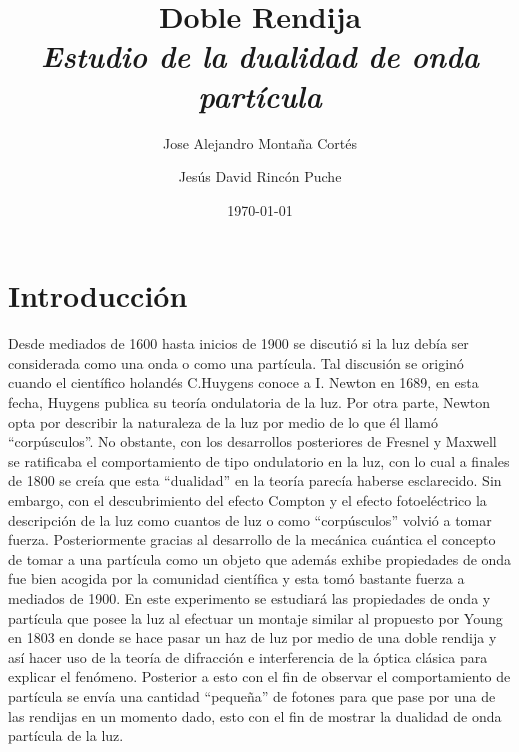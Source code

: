 \documentclass[%
 reprint,
 amsmath,amssymb,
 aps,
]{revtex4-1}
\newcommand{\subtitle}[1]{%
\posttitle{%
    \par\end{center}
\begin{center}\large#1\end{center}
\vskip0.5em}%
}
\begin{document}

\title{Doble Rendija\\ \textit{Estudio de la dualidad de onda partícula} }%


\author{Jose Alejandro Montaña Cortés}
\author{Jesús David Rincón Puche}%
%


\date{\today}%

\begin{abstract}



\end{abstract}
\maketitle

\section{Introducción}
Desde mediados de 1600 hasta inicios de 1900 se discutió si la luz debía ser considerada como una onda o como una partícula. Tal discusión se originó cuando el científico holandés C.Huygens conoce a  I. Newton en 1689, en esta fecha, Huygens publica su  teoría ondulatoria de la luz. Por otra parte, Newton opta por describir la naturaleza de la luz por medio de lo que él llamó “corpúsculos”. No obstante, con los desarrollos posteriores de Fresnel y Maxwell se ratificaba el comportamiento de tipo ondulatorio en la luz, con lo cual a finales de 1800 se creía que esta “dualidad” en la teoría parecía haberse esclarecido. Sin embargo, con el descubrimiento del efecto Compton y el efecto fotoeléctrico la descripción de la luz como cuantos de luz o como “corpúsculos” volvió a tomar fuerza. Posteriormente gracias al desarrollo de la mecánica cuántica el concepto de tomar a una partícula como un objeto que además exhibe propiedades de onda fue bien acogida por la comunidad científica y esta tomó bastante fuerza a mediados de 1900. En este experimento se estudiará las propiedades de onda y partícula que posee la luz al efectuar un montaje similar al propuesto por Young en 1803 en donde se hace pasar un haz de luz por medio de una doble rendija y así hacer uso de la teoría de difracción e interferencia de la óptica clásica para explicar el fenómeno. Posterior a esto con el fin de observar el comportamiento de partícula se envía una cantidad “pequeña” de fotones para que pase por una de las rendijas en un momento dado, esto con el fin de mostrar la dualidad de onda partícula de la luz.
\end{document}
